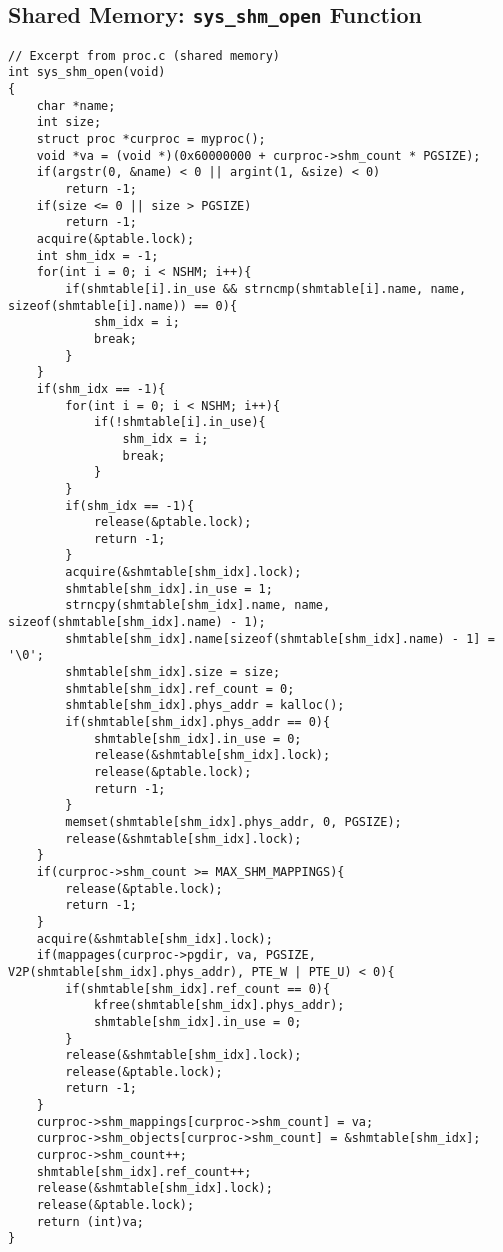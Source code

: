 \documentclass[12pt]{article}
\begin{document}
\subsection*{Shared Memory: \texttt{sys\_shm\_open} Function}
\begin{lstlisting}
// Excerpt from proc.c (shared memory)
int sys_shm_open(void)
{
    char *name;
    int size;
    struct proc *curproc = myproc();
    void *va = (void *)(0x60000000 + curproc->shm_count * PGSIZE);
    if(argstr(0, &name) < 0 || argint(1, &size) < 0)
        return -1;
    if(size <= 0 || size > PGSIZE)
        return -1;
    acquire(&ptable.lock);
    int shm_idx = -1;
    for(int i = 0; i < NSHM; i++){
        if(shmtable[i].in_use && strncmp(shmtable[i].name, name, sizeof(shmtable[i].name)) == 0){
            shm_idx = i;
            break;
        }
    }
    if(shm_idx == -1){
        for(int i = 0; i < NSHM; i++){
            if(!shmtable[i].in_use){
                shm_idx = i;
                break;
            }
        }
        if(shm_idx == -1){
            release(&ptable.lock);
            return -1;
        }
        acquire(&shmtable[shm_idx].lock);
        shmtable[shm_idx].in_use = 1;
        strncpy(shmtable[shm_idx].name, name, sizeof(shmtable[shm_idx].name) - 1);
        shmtable[shm_idx].name[sizeof(shmtable[shm_idx].name) - 1] = '\0';
        shmtable[shm_idx].size = size;
        shmtable[shm_idx].ref_count = 0;
        shmtable[shm_idx].phys_addr = kalloc();
        if(shmtable[shm_idx].phys_addr == 0){
            shmtable[shm_idx].in_use = 0;
            release(&shmtable[shm_idx].lock);
            release(&ptable.lock);
            return -1;
        }
        memset(shmtable[shm_idx].phys_addr, 0, PGSIZE);
        release(&shmtable[shm_idx].lock);
    }
    if(curproc->shm_count >= MAX_SHM_MAPPINGS){
        release(&ptable.lock);
        return -1;
    }
    acquire(&shmtable[shm_idx].lock);
    if(mappages(curproc->pgdir, va, PGSIZE, V2P(shmtable[shm_idx].phys_addr), PTE_W | PTE_U) < 0){
        if(shmtable[shm_idx].ref_count == 0){
            kfree(shmtable[shm_idx].phys_addr);
            shmtable[shm_idx].in_use = 0;
        }
        release(&shmtable[shm_idx].lock);
        release(&ptable.lock);
        return -1;
    }
    curproc->shm_mappings[curproc->shm_count] = va;
    curproc->shm_objects[curproc->shm_count] = &shmtable[shm_idx];
    curproc->shm_count++;
    shmtable[shm_idx].ref_count++;
    release(&shmtable[shm_idx].lock);
    release(&ptable.lock);
    return (int)va;
}
\end{lstlisting}
\end{document}

